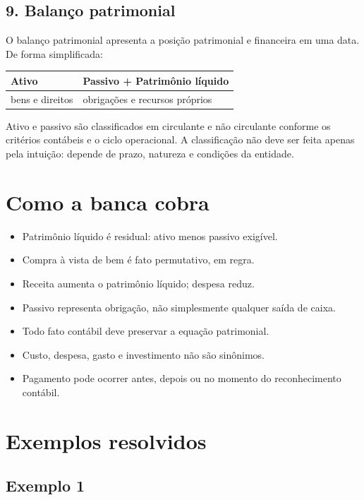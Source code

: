 \documentclass[11pt,a4paper]{article}
\begin{document}
\subsection*{9. Balanço patrimonial}

O balanço patrimonial apresenta a posição patrimonial e financeira em uma data. De forma simplificada:

\begin{tabularx}{\linewidth}{lX}
\toprule
 \textbf{Ativo} & \textbf{Passivo + Patrimônio líquido} \\
\midrule
 bens e direitos & obrigações e recursos próprios \\
\bottomrule
\end{tabularx}


Ativo e passivo são classificados em circulante e não circulante conforme os critérios contábeis e o ciclo operacional. A classificação não deve ser feita apenas pela intuição: depende de prazo, natureza e condições da entidade.

\section*{Como a banca cobra}

\begin{itemize}
  \item Patrimônio líquido é residual: ativo menos passivo exigível.
  \item Compra à vista de bem é fato permutativo, em regra.
  \item Receita aumenta o patrimônio líquido; despesa reduz.
  \item Passivo representa obrigação, não simplesmente qualquer saída de caixa.
  \item Todo fato contábil deve preservar a equação patrimonial.
  \item Custo, despesa, gasto e investimento não são sinônimos.
  \item Pagamento pode ocorrer antes, depois ou no momento do reconhecimento contábil.
\end{itemize}

\section*{Exemplos resolvidos}

\subsection*{Exemplo 1}
\end{document}
